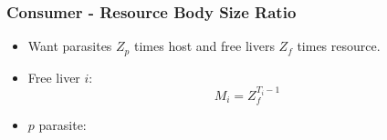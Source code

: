 \documentclass[table]{beamer}
\begin{document}
\begin{frame}
\frametitle{Consumer - Resource Body Size Ratio}
\begin{itemize}
\item<1-> Want parasites $Z_p$ times host and free livers $Z_f$ times resource.
\item<2-> Free liver $i$:
\[
M_i=Z_f^{T_i-1}
\]
\item<3-> $p$ parasite:

\end{itemize}
\end{frame}
\end{document}

